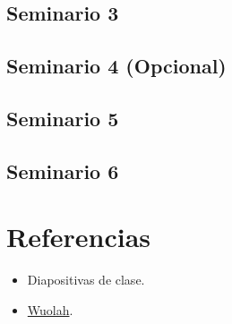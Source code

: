 \documentclass[a4paper,12pt]{article}
\begin{document}
\subsection{Seminario 3}


\subsection{Seminario 4 (Opcional)}


\subsection{Seminario 5}


\subsection{Seminario 6}


\section{Referencias}
\begin{itemize}
    \item Diapositivas de clase.
    \item \href{https://www.wuoalh.com/}{Wuolah}.
\end{itemize}
\end{document}
